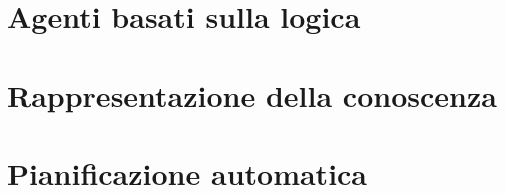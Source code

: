 \section{Agenti basati sulla logica}

%

\section{Rappresentazione della conoscenza}

%

\section{Pianificazione automatica}